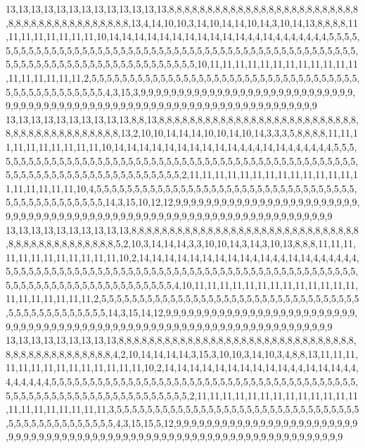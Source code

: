 13,13,13,13,13,13,13,13,13,13,13,13,13,8,8,8,8,8,8,8,8,8,8,8,8,8,8,8,8,8,8,8,8,8,8,8,8,8,8,8,8,8,8,8,8,8,8,8,8,8,8,8,8,8,13,4,14,10,10,3,14,10,14,14,10,14,3,10,14,13,8,8,8,8,11,11,11,11,11,11,11,11,10,14,14,14,14,14,14,14,14,14,14,14,4,4,14,4,4,4,4,4,4,4,5,5,5,5,5,5,5,5,5,5,5,5,5,5,5,5,5,5,5,5,5,5,5,5,5,5,5,5,5,5,5,5,5,5,5,5,5,5,5,5,5,5,5,5,5,5,5,5,5,5,5,5,5,5,5,5,5,5,5,5,5,5,5,5,5,5,5,5,5,5,5,5,5,5,5,10,11,11,11,11,11,11,11,11,11,11,11,11,11,11,11,11,11,11,2,5,5,5,5,5,5,5,5,5,5,5,5,5,5,5,5,5,5,5,5,5,5,5,5,5,5,5,5,5,5,5,5,5,5,5,5,5,5,5,5,5,5,5,5,5,5,5,5,4,3,15,3,9,9,9,9,9,9,9,9,9,9,9,9,9,9,9,9,9,9,9,9,9,9,9,9,9,9,9,9,9,9,9,9,9,9,9,9,9,9,9,9,9,9,9,9,9,9,9,9,9,9,9,9,9,9,9,9,9,9,9,9,9,9,9,9,9,9,9,9,9
13,13,13,13,13,13,13,13,13,13,8,8,13,8,8,8,8,8,8,8,8,8,8,8,8,8,8,8,8,8,8,8,8,8,8,8,8,8,8,8,8,8,8,8,8,8,8,8,8,8,8,8,8,8,13,2,10,10,14,14,14,10,10,14,10,14,3,3,3,5,8,8,8,8,11,11,11,11,11,11,11,11,11,11,10,14,14,14,14,14,14,14,14,14,14,4,4,4,14,14,4,4,4,4,4,4,5,5,5,5,5,5,5,5,5,5,5,5,5,5,5,5,5,5,5,5,5,5,5,5,5,5,5,5,5,5,5,5,5,5,5,5,5,5,5,5,5,5,5,5,5,5,5,5,5,5,5,5,5,5,5,5,5,5,5,5,5,5,5,5,5,5,5,5,5,5,5,5,2,11,11,11,11,11,11,11,11,11,11,11,11,11,11,11,11,11,11,11,10,4,5,5,5,5,5,5,5,5,5,5,5,5,5,5,5,5,5,5,5,5,5,5,5,5,5,5,5,5,5,5,5,5,5,5,5,5,5,5,5,5,5,5,5,5,5,5,5,14,3,15,10,12,12,9,9,9,9,9,9,9,9,9,9,9,9,9,9,9,9,9,9,9,9,9,9,9,9,9,9,9,9,9,9,9,9,9,9,9,9,9,9,9,9,9,9,9,9,9,9,9,9,9,9,9,9,9,9,9,9,9,9,9,9,9,9,9,9,9,9,9
13,13,13,13,13,13,13,13,13,13,8,8,8,8,8,8,8,8,8,8,8,8,8,8,8,8,8,8,8,8,8,8,8,8,8,8,8,8,8,8,8,8,8,8,8,8,8,8,8,8,8,8,8,8,5,2,10,3,14,14,14,3,3,10,10,14,3,14,3,10,13,8,8,8,11,11,11,11,11,11,11,11,11,11,11,11,10,2,14,14,14,14,14,14,14,14,14,4,14,4,4,14,14,4,4,4,4,4,4,5,5,5,5,5,5,5,5,5,5,5,5,5,5,5,5,5,5,5,5,5,5,5,5,5,5,5,5,5,5,5,5,5,5,5,5,5,5,5,5,5,5,5,5,5,5,5,5,5,5,5,5,5,5,5,5,5,5,5,5,5,5,5,5,5,5,5,5,4,10,11,11,11,11,11,11,11,11,11,11,11,11,11,11,11,11,11,11,11,11,2,5,5,5,5,5,5,5,5,5,5,5,5,5,5,5,5,5,5,5,5,5,5,5,5,5,5,5,5,5,5,5,5,5,5,5,5,5,5,5,5,5,5,5,5,5,5,5,14,3,15,14,12,9,9,9,9,9,9,9,9,9,9,9,9,9,9,9,9,9,9,9,9,9,9,9,9,9,9,9,9,9,9,9,9,9,9,9,9,9,9,9,9,9,9,9,9,9,9,9,9,9,9,9,9,9,9,9,9,9,9,9,9,9,9,9,9,9,9,9,9
13,13,13,13,13,13,13,13,13,8,8,8,8,8,8,8,8,8,8,8,8,8,8,8,8,8,8,8,8,8,8,8,8,8,8,8,8,8,8,8,8,8,8,8,8,8,8,8,8,8,8,8,8,8,4,2,10,14,14,14,14,3,15,3,10,10,3,14,10,3,4,8,8,13,11,11,11,11,11,11,11,11,11,11,11,11,11,11,10,2,14,14,14,14,14,14,14,14,14,14,4,4,14,14,14,4,4,4,4,4,4,4,4,5,5,5,5,5,5,5,5,5,5,5,5,5,5,5,5,5,5,5,5,5,5,5,5,5,5,5,5,5,5,5,5,5,5,5,5,5,5,5,5,5,5,5,5,5,5,5,5,5,5,5,5,5,5,5,5,5,5,5,5,5,5,5,5,2,11,11,11,11,11,11,11,11,11,11,11,11,11,11,11,11,11,11,11,11,11,3,5,5,5,5,5,5,5,5,5,5,5,5,5,5,5,5,5,5,5,5,5,5,5,5,5,5,5,5,5,5,5,5,5,5,5,5,5,5,5,5,5,5,5,5,5,5,4,3,15,15,5,12,9,9,9,9,9,9,9,9,9,9,9,9,9,9,9,9,9,9,9,9,9,9,9,9,9,9,9,9,9,9,9,9,9,9,9,9,9,9,9,9,9,9,9,9,9,9,9,9,9,9,9,9,9,9,9,9,9,9,9,9,9,9,9,9,9,9,9,9
